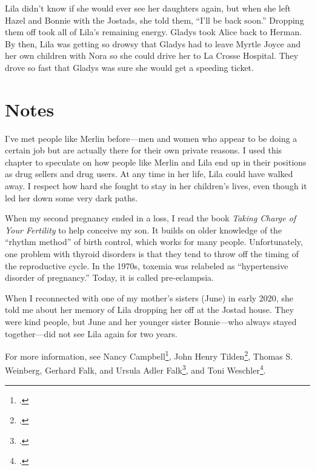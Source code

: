 \documentclass[
  letterpaper,
]{book}
\begin{document}
Lila didn't know if she would ever see her daughters again, but when she
left Hazel and Bonnie with the Jostads, she told them, ``I'll be back
soon.'' Dropping them off took all of Lila's remaining energy. Gladys
took Alice back to Herman. By then, Lila was getting so drowsy that
Gladys had to leave Myrtle Joyce and her own children with Nora so she
could drive her to La Crosse Hospital. They drove so fast that Gladys
was sure she would get a speeding ticket.

\section{Notes}\label{notes-56}

I've met people like Merlin before---men and women who appear to be
doing a certain job but are actually there for their own private
reasons. I used this chapter to speculate on how people like Merlin and
Lila end up in their positions as drug sellers and drug users. At any
time in her life, Lila could have walked away. I respect how hard she
fought to stay in her children's lives, even though it led her down some
very dark paths.

When my second pregnancy ended in a loss, I read the book \emph{Taking
Charge of Your Fertility} to help conceive my son. It builds on older
knowledge of the ``rhythm method'' of birth control, which works for
many people. Unfortunately, one problem with thyroid disorders is that
they tend to throw off the timing of the reproductive cycle. In the
1970s, toxemia was relabeled as ``hypertensive disorder of pregnancy.''
Today, it is called pre-eclampsia.

When I reconnected with one of my mother's sisters (June) in early 2020,
she told me about her memory of Lila dropping her off at the Jostad
house. They were kind people, but June and her younger sister
Bonnie---who always stayed together---did not see Lila again for two
years.

For more information, see Nancy Campbell\footnote{.}, John Henry Tilden\footnote{.}, Thomas S. Weinberg, Gerhard Falk, and Ursula
Adler Falk\footnote{.}, and
Toni Weschler\footnote{.}.
\end{document}
